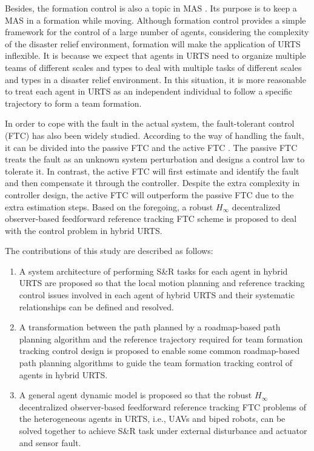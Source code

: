 \documentclass{ieeeaccess}
\begin{document}
Besides, the formation control is also a topic in MAS \cite{wang2022consensus}. Its purpose is to keep a MAS in a formation while moving. Although formation control provides a simple framework for the control of a large number of agents, considering the complexity of the disaster relief environment, formation will make the application of URTS inflexible. It is because we expect that agents in URTS need to organize multiple teams of different scales and types to deal with multiple tasks of different scales and types in a disaster relief environment. In this situation, it is more reasonable to treat each agent in URTS as an independent individual to follow a specific trajectory to form a team formation.

In order to cope with the fault in the actual system, the fault-tolerant control (FTC) has also been widely studied. According to the way of handling the fault, it can be divided into the passive FTC and the active FTC \cite{6669235}. The passive FTC treats the fault as an unknown system perturbation and designs a control law to tolerate it. In contrast, the active FTC will first estimate and identify the fault and then compensate it through the controller. Despite the extra complexity in controller design, the active FTC will outperform the passive FTC due to the extra estimation steps. Based on the foregoing, a robust $H_\infty$ decentralized observer-based feedforward reference tracking FTC scheme is proposed to deal with the control problem in hybrid URTS.

The contributions of this study are described as follows:
\begin{enumerate}
    \item A system architecture of performing S\&R tasks for each agent in hybrid URTS are proposed so that the local motion planning and reference tracking control issues involved in each agent of hybrid URTS and their systematic relationships can be defined and resolved.
    \item A transformation between the path planned by a roadmap-based path planning algorithm and the reference trajectory required for team formation tracking control design is proposed to enable some common roadmap-based path planning algorithms to guide the team formation tracking control of agents in hybrid URTS.
    \item A general agent dynamic model is proposed so that the robust $H_\infty$ decentralized observer-based feedforward reference tracking FTC problems of the heterogeneous agents in URTS, i.e., UAVs and biped robots, can be solved together to achieve S\&R task under external disturbance and actuator and sensor fault.
\end{enumerate}
\end{document}
